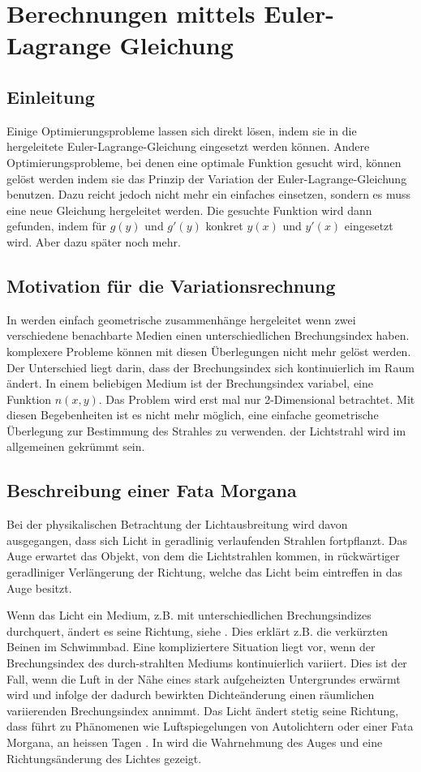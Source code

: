\section{Berechnungen mittels Euler-Lagrange Gleichung}
\subsection{Einleitung}
Einige Optimierungsprobleme lassen sich direkt lösen, indem sie in die hergeleitete Euler-Lagrange-Gleichung eingesetzt werden können. Andere Optimierungsprobleme, bei denen eine optimale Funktion gesucht wird, können gelöst werden indem sie das Prinzip der Variation der Euler-Lagrange-Gleichung benutzen. Dazu reicht jedoch nicht mehr ein einfaches einsetzen, sondern es muss eine neue Gleichung hergeleitet werden. Die gesuchte Funktion wird dann gefunden, indem für $g(y)$ und $g'(y)$ konkret $y(x)$ und $y'(x)$ eingesetzt wird. Aber dazu später noch mehr.

\subsection{Motivation für die Variationsrechnung}
In  werden einfach geometrische zusammenhänge hergeleitet wenn zwei verschiedene benachbarte Medien einen unterschiedlichen Brechungsindex haben. komplexere Probleme können mit diesen Überlegungen nicht mehr gelöst werden. Der Unterschied liegt darin, dass der Brechungsindex sich kontinuierlich im Raum ändert. In   einem  beliebigen  Medium  ist  der Brechungsindex variabel, eine Funktion $n(x,y)$. Das  Problem wird erst mal nur 2-Dimensional betrachtet. Mit diesen Begebenheiten ist es nicht mehr möglich, eine einfache geometrische Überlegung  zur  Bestimmung  des  Strahles  zu verwenden. der Lichtstrahl wird im allgemeinen gekrümmt sein.

\subsection{Beschreibung einer Fata Morgana}
Bei der physikalischen Betrachtung der Lichtausbreitung wird davon ausgegangen, dass sich Licht in
geradlinig verlaufenden Strahlen fortpflanzt. Das Auge erwartet das Objekt, von dem die Lichtstrahlen
kommen, in rückwärtiger geradliniger Verlängerung der Richtung, welche das Licht beim eintreffen in das Auge besitzt.

Wenn das Licht ein Medium, z.B. mit unterschiedlichen Brechungsindizes durchquert, ändert es seine Richtung, siehe . Dies erklärt z.B. die verkürzten Beinen im Schwimmbad.
Eine kompliziertere Situation liegt vor, wenn der Brechungsindex des durch-strahlten Mediums kontinuierlich variiert. 
Dies ist der Fall, wenn die Luft in der Nähe eines stark aufgeheizten Untergrundes erwärmt
wird und infolge der dadurch bewirkten Dichteänderung einen räumlichen variierenden Brechungsindex annimmt. 
Das Licht ändert stetig seine Richtung, dass führt zu Phänomenen wie Luftspiegelungen von Autolichtern oder einer Fata Morgana, an heissen Tagen \cite{fataEinleitung}.
In  wird die Wahrnehmung des Auges und eine Richtungsänderung des Lichtes gezeigt.

